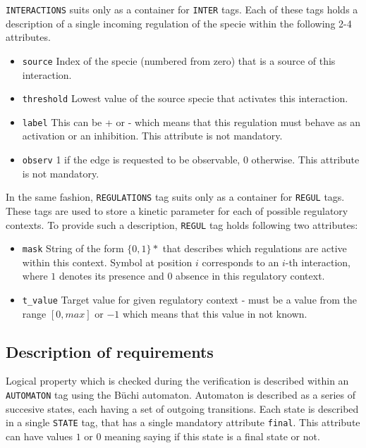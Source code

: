 \documentclass[12pt]{article}
\begin{document}
\texttt{INTERACTIONS} suits only as a container for \texttt{INTER} tags. Each of these tags holds a description of a single incoming regulation of the specie within the following 2-4 attributes.
\begin{itemize}
\item \texttt{source} Index of the specie (numbered from zero) that is a source of this interaction. 
\item \texttt{threshold} Lowest value of the source specie that activates this interaction.
\item \texttt{label} This can be + or - which means that this regulation must behave as an activation or an inhibition. This attribute is not mandatory. 
\item \texttt{observ} 1 if the edge is requested to be observable, 0 otherwise. This attribute is not mandatory. 
\end{itemize}

In the same fashion, \texttt{REGULATIONS} tag suits only as a container for \texttt{REGUL} tags. These tags are used to store a kinetic parameter for each of possible regulatory contexts. To provide such a description, \texttt{REGUL} tag holds following two attributes:
\begin{itemize}
\item \texttt{mask} String of the form $\{0,1\}*$ that describes which regulations are active within this context. Symbol at position $i$ corresponds to an $i$-th interaction, where $1$ denotes its presence and $0$ absence in this regulatory context.
\item \texttt{t\_value} Target value for given regulatory context - must be a value from the range $[0,max]$ or $-1$ which means that this value in not known.
\end{itemize}

\subsection{Description of requirements}
Logical property which is checked during the verification is described within an \texttt{AUTOMATON} tag using the B\"{u}chi automaton. Automaton is described as a series of succesive states, each having a set of outgoing transitions.
Each state is described in a single \texttt{STATE} tag, that has a single mandatory attribute \texttt{final}. This attribute can have values $1$ or $0$ meaning saying if this state is a final state or not.
\end{document}
